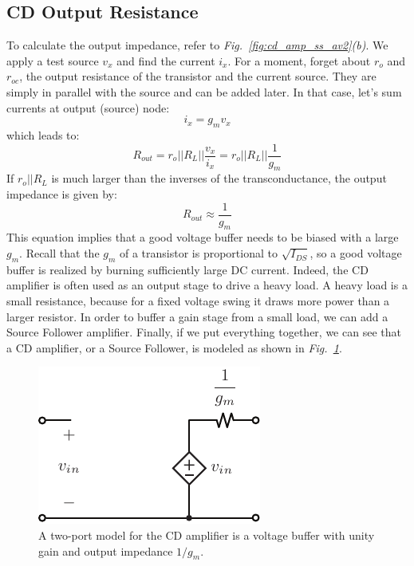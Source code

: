 \subsection{CD Output Resistance}
To calculate the output impedance, refer to \emph{Fig.~\ref{fig:cd_amp_ss_av2}(b)}.  We apply a test source $v_x$ and find the current $i_x$.  For a moment, forget about $r_o$ and $r_{oc}$, the output resistance of the transistor and the current source.  They are simply in parallel with the source and can be added later.  In that case, let's sum currents at output (source) node:
    \begin{equation}
        {i_x} = {g_m}{v_x}
    \end{equation}
which leads to:
    \begin{equation}
        {R_{out}} = {r_o}||{R_L}||\frac{{{v_x}}}{{{i_x}}} = {r_o}||{R_L}||\frac{1}{g_m}
    \end{equation}
If $r_o || R_L$ is much larger than the inverses of the transconductance, the output impedance is given by:
    \begin{equation}
        {R_{out}} \approx \frac{1}{{{g_m}}}
    \end{equation}
This equation implies that a good voltage buffer needs to be biased with a large $g_m$.  Recall that the $g_m$ of a transistor is proportional to $\sqrt{I_{DS}}$, so a good voltage buffer is realized by burning sufficiently large DC current.  Indeed, the CD amplifier is often used as an output stage to drive a heavy load.  A heavy load is a small resistance, because for a fixed voltage swing it draws more power than a larger resistor.  In order to buffer a gain stage from a small load, we can add a Source Follower amplifier.
Finally, if we put everything together, we can see that a CD amplifier, or a Source Follower, is modeled as shown in \emph{Fig.~\ref{fig:cd_amp_model}}.  
\begin{figure}[tb]
\centering
\includegraphics[scale=1]{cd_amp_model}
\caption{A two-port model for the CD amplifier is a voltage buffer with unity gain and output impedance $1/g_m$.}
\label{fig:cd_amp_model}
\end{figure}
\newpage
